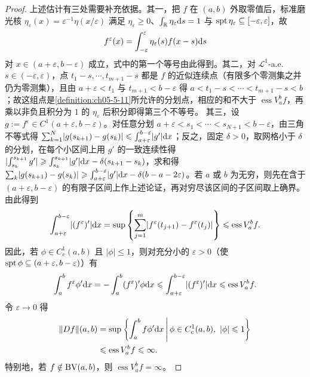 \documentclass[../../main.tex]{subfiles}%
\begin{document}
\begin{proof}
上述估计有三处需要补充依据。其一，把 $f$ 在 $(a,b)$ 外取零值后，标准磨光核 $\eta_\varepsilon(x)=\varepsilon^{-1}\eta(x/\varepsilon)$ 满足 $\eta_\varepsilon\geqslant0$、$\int_{\mathbb{R}}\eta_\varepsilon\mathrm{d} s=1$ 与 $\operatorname{spt}\eta_\varepsilon\subseteq[-\varepsilon,\varepsilon]$，故
\begin{align*}
f^\varepsilon(x)=\int_{-\varepsilon}^{\varepsilon}\eta_\varepsilon(s)f(x-s)\mathrm{d} s
\end{align*}
对 $x\in(a+\varepsilon,b-\varepsilon)$ 成立，式中的第一个等号由此得到。其二，对 $\mathcal{L}^1$-a.e. $s\in(-\varepsilon,\varepsilon)$，点 $t_1-s,\cdots,t_{m+1}-s$ 都是 $f$ 的近似连续点（有限多个零测集之并仍为零测集），且由 $a+\varepsilon<t_1$ 与 $t_{m+1}<b-\varepsilon$ 得 $a<t_1-s<\cdots<t_{m+1}-s<b$；故这组点是\cref{definition:ch05-5-11}所允许的分划点，相应的和不大于 $\operatorname{ess}V_a^b f$，再乘以非负且积分为 $1$ 的 $\eta_\varepsilon$ 后积分即得第三个不等号。%
其三，设 $g:=f^\varepsilon\in C^1(a+\varepsilon,b-\varepsilon)$。对任意分划 $a+\varepsilon<s_1<\cdots<s_{N+1}<b-\varepsilon$，由三角不等式得 $\sum_{k=1}^N\lvert g(s_{k+1})-g(s_k)\rvert\leqslant\int_{a+\varepsilon}^{b-\varepsilon}\lvert g'\rvert\mathrm{d} x$；反之，固定 $\delta>0$，取网格小于 $\delta$ 的分划，在每个小区间上用 $g'$ 的一致连续性得 $\lvert\int_{s_k}^{s_{k+1}}g'\rvert\geqslant\int_{s_k}^{s_{k+1}}\lvert g'\rvert\mathrm{d} x-\delta(s_{k+1}-s_k)$，求和得 $\sum_{k}\lvert g(s_{k+1})-g(s_k)\rvert\geqslant\int_{a+\varepsilon}^{b-\varepsilon}\lvert g'\rvert\mathrm{d} x-\delta(b-a-2\varepsilon)$。若 $a$ 或 $b$ 为无穷，则先在含于 $(a+\varepsilon,b-\varepsilon)$ 的有限子区间上作上述论证，再对穷尽该区间的子区间取上确界。
由此得到
\begin{align*}
\int_{a+\varepsilon}^{b-\varepsilon}\lvert(f^\varepsilon)'\rvert\mathrm{d} x=\sup\left\{\sum_{j=1}^m\lvert f^\varepsilon(t_{j+1})-f^\varepsilon(t_j)\rvert\right\}\leqslant\operatorname{ess}V_a^b f .
\end{align*}
因此，若 $\phi\in C_c^1(a,b)$ 且 $\lvert\phi\rvert\leqslant1$，则对充分小的 $\varepsilon>0$（使 $\operatorname{spt}\phi\subseteq(a+\varepsilon,b-\varepsilon)$）有
\begin{align*}
\int_a^b f^\varepsilon\phi'\mathrm{d} x=-\int_a^b(f^\varepsilon)'\phi\mathrm{d} x\leqslant\int_{a+\varepsilon}^{b-\varepsilon}\lvert(f^\varepsilon)'\rvert\mathrm{d} x\leqslant\operatorname{ess}V_a^b f .
\end{align*}
令 $\varepsilon\to0$ 得
\begin{align*}
\lVert Df\rVert(a,b)&=\sup\left\{\int_a^b f\phi'\mathrm{d} x\,\middle|\,\phi\in C_c^1(a,b),\ \lvert\phi\rvert\leqslant1\right\}\\
&\leqslant\operatorname{ess}V_a^b f\leqslant\infty .
\end{align*}
特别地，若 $f\notin\mathrm{BV}(a,b)$，则 $\operatorname{ess}V_a^b f=\infty$。


\end{proof}
\end{document}
